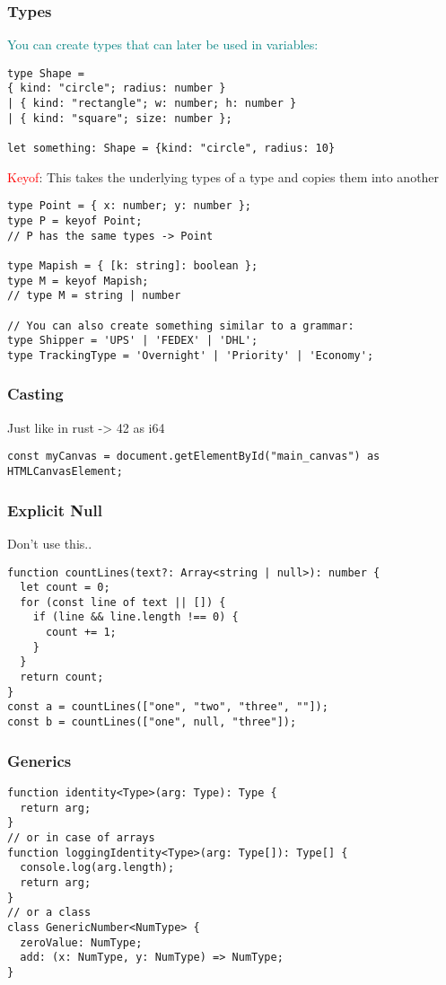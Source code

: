 \documentclass[main.tex,fontsize=8pt,paper=a4,paper=portrait,DIV=calc,]{scrartcl}
\begin{document}
\subsubsection{Types}
\textcolor{teal}{You can create types that can later be used in variables:}
\begin{lstlisting}
type Shape =
{ kind: "circle"; radius: number }
| { kind: "rectangle"; w: number; h: number }
| { kind: "square"; size: number };

let something: Shape = {kind: "circle", radius: 10}
\end{lstlisting}
\textcolor{red}{Keyof}: This takes the underlying types of a type and copies them into another
\begin{lstlisting}
type Point = { x: number; y: number };
type P = keyof Point;
// P has the same types -> Point

type Mapish = { [k: string]: boolean };
type M = keyof Mapish;   
// type M = string | number

// You can also create something similar to a grammar:
type Shipper = 'UPS' | 'FEDEX' | 'DHL';
type TrackingType = 'Overnight' | 'Priority' | 'Economy';
\end{lstlisting}

\subsubsection{Casting}
Just like in rust -> 42 as i64
\begin{lstlisting}
const myCanvas = document.getElementById("main_canvas") as HTMLCanvasElement;
\end{lstlisting}

\subsubsection{Explicit Null}
Don't use this..
\begin{lstlisting}
function countLines(text?: Array<string | null>): number {
  let count = 0;
  for (const line of text || []) {
    if (line && line.length !== 0) {
      count += 1;
    }
  }
  return count;
}
const a = countLines(["one", "two", "three", ""]);
const b = countLines(["one", null, "three"]);
\end{lstlisting}

\subsubsection{Generics}
\begin{lstlisting}
function identity<Type>(arg: Type): Type {
  return arg;
}
// or in case of arrays
function loggingIdentity<Type>(arg: Type[]): Type[] {
  console.log(arg.length);
  return arg;
}
// or a class
class GenericNumber<NumType> {
  zeroValue: NumType;
  add: (x: NumType, y: NumType) => NumType;
}
\end{lstlisting}
\end{document}
